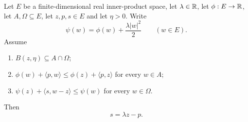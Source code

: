\begin{lemma}
Let $E$ be a finite-dimensional real inner-product space, let $\lambda\in\mathbb{R}$, let
$\phi:E\to\mathbb{R}$, let $A,\Omega\subseteq E$, let $z,p,s\in E$ and let $\eta>0$. Write
\[
  \psi(w)=\phi(w)+\frac{\lambda|w|^2}{2}\qquad(w\in E).
\]
Assume
\begin{enumerate}
  \item $B(z,\eta)\subseteq A\cap\Omega$;
  \item $\phi(w)+\langle p,w\rangle\le\phi(z)+\langle p,z\rangle$ for every
    $w\in A$;
  \item $\psi(z)+\langle s,w-z\rangle\le\psi(w)$ for every $w\in\Omega$.
\end{enumerate}
Then
\[
  s=\lambda z-p .
\]
\end{lemma}
